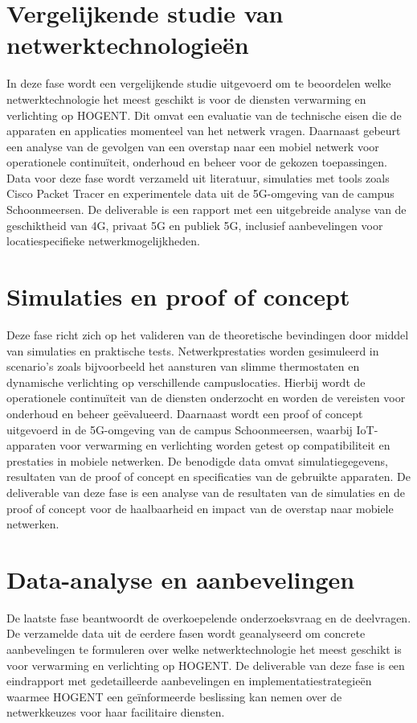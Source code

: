 \section{Vergelijkende studie van netwerktechnologieën}
In deze fase wordt een vergelijkende studie uitgevoerd om te beoordelen welke netwerktechnologie het meest geschikt is voor de diensten verwarming en verlichting op HOGENT. Dit omvat een evaluatie van de technische eisen die de apparaten en applicaties momenteel van het netwerk vragen. Daarnaast gebeurt een analyse van de gevolgen van een overstap naar een mobiel netwerk voor operationele continuïteit, onderhoud en beheer voor de gekozen toepassingen. Data voor deze fase wordt verzameld uit literatuur, simulaties met tools zoals Cisco Packet Tracer en experimentele data uit de 5G-omgeving van de campus Schoonmeersen. De deliverable is een rapport met een uitgebreide analyse van de geschiktheid van 4G, privaat 5G en publiek 5G, inclusief aanbevelingen voor locatiespecifieke netwerkmogelijkheden.

\section{Simulaties en proof of concept}
Deze fase richt zich op het valideren van de theoretische bevindingen door middel van simulaties en praktische tests. Netwerkprestaties worden gesimuleerd in scenario's zoals bijvoorbeeld het aansturen van slimme thermostaten en dynamische verlichting op verschillende campuslocaties. Hierbij wordt de operationele continuïteit van de diensten onderzocht en worden de vereisten voor onderhoud en beheer geëvalueerd. Daarnaast wordt een proof of concept uitgevoerd in de 5G-omgeving van de campus Schoonmeersen, waarbij IoT-apparaten voor verwarming en verlichting worden getest op compatibiliteit en prestaties in mobiele netwerken. De benodigde data omvat simulatiegegevens, resultaten van de proof of concept en specificaties van de gebruikte apparaten. De deliverable van deze fase is een analyse van de resultaten van de simulaties en de proof of concept voor de haalbaarheid en impact van de overstap naar mobiele netwerken.

\section{Data-analyse en aanbevelingen}
De laatste fase beantwoordt de overkoepelende onderzoeksvraag en de deelvragen. De verzamelde data uit de eerdere fasen wordt geanalyseerd om concrete aanbevelingen te formuleren over welke netwerktechnologie het meest geschikt is voor verwarming en verlichting op HOGENT. De deliverable van deze fase is een eindrapport met gedetailleerde aanbevelingen en implementatiestrategieën waarmee HOGENT een geïnformeerde beslissing kan nemen over de netwerkkeuzes voor haar facilitaire diensten.
